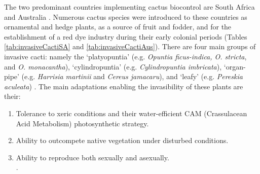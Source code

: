 The two predominant countries implementing cactus biocontrol are South Africa and Australia \citep{Moran1991a, paterson2019prospects}.
Numerous cactus species were introduced to these countries as ornamental and hedge plants, as a source of fruit and fodder, and for the establishment of a red dye industry during their early colonial periods \citep{Zimmermann2009, Paterson2011BiologicalAfrica, kaplan2017proposed, managingOpuntioid2017} (Tables \ref{tab:invasiveCactiSA} and \ref{tab:invasiveCactiAus}). There are four main groups of invasive cacti: namely the `platyopuntia' (e.g. \textit{Opuntia ficus-indica, O. stricta}, and \textit{O. monacantha}), `cylindropuntia' (e.g. \textit{Cylindropuntia imbricata}), `organ-pipe' (e.g. \textit{Harrisia martinii} and \textit{Cereus jamacaru}), and `leafy' (e.g. \textit{Pereskia aculeata}) \citep{Klein2002WeedsBiocontrol}. The main adaptations enabling the invasibility of these plants are their:
\vspace{0.4cm}
\begin{enumerate}
    \item Tolerance to xeric conditions and their water-efficient CAM (Crassulacean Acid Metabolism) photosynthetic strategy.
    \item Ability to outcompete native vegetation under disturbed conditions.
    \item Ability to reproduce both sexually and asexually. \\ \citep{Zimmermann2009}.
\end{enumerate}
\vspace{0.4cm}

